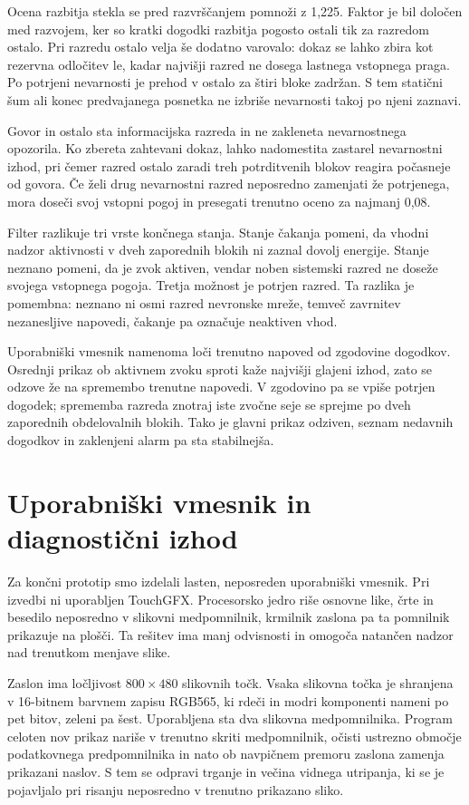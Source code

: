 Ocena razbitja stekla se pred razvrščanjem pomnoži z 1,225. Faktor je bil
določen med razvojem, ker so kratki dogodki razbitja pogosto ostali tik za
razredom ostalo. Pri razredu ostalo velja še dodatno varovalo: dokaz se lahko
zbira kot rezervna odločitev le, kadar najvišji razred ne dosega lastnega
vstopnega praga. Po potrjeni nevarnosti je prehod v ostalo za štiri bloke
zadržan. S tem statični šum ali konec predvajanega posnetka ne izbriše
nevarnosti takoj po njeni zaznavi.

Govor in ostalo sta informacijska razreda in ne zakleneta nevarnostnega
opozorila. Ko zbereta zahtevani dokaz, lahko nadomestita zastarel nevarnostni
izhod, pri čemer razred ostalo zaradi treh potrditvenih blokov reagira počasneje
od govora. Če želi drug nevarnostni razred neposredno zamenjati že potrjenega,
mora doseči svoj vstopni pogoj in presegati trenutno oceno za najmanj 0,08.

Filter razlikuje tri vrste končnega stanja. Stanje čakanja pomeni, da vhodni
nadzor aktivnosti v dveh zaporednih blokih ni zaznal dovolj energije. Stanje
neznano pomeni, da je zvok aktiven, vendar noben sistemski razred ne doseže
svojega vstopnega pogoja. Tretja možnost je potrjen razred. Ta razlika je
pomembna: neznano ni osmi razred nevronske mreže, temveč zavrnitev
nezanesljive napovedi, čakanje pa označuje neaktiven vhod.

Uporabniški vmesnik namenoma loči trenutno napoved od zgodovine dogodkov.
Osrednji prikaz ob aktivnem zvoku sproti kaže najvišji glajeni izhod, zato se
odzove že na spremembo trenutne napovedi. V zgodovino pa se vpiše potrjen
dogodek; sprememba razreda znotraj iste zvočne seje se sprejme po dveh
zaporednih obdelovalnih blokih. Tako je glavni prikaz odziven, seznam nedavnih
dogodkov in zaklenjeni alarm pa sta stabilnejša.

\section{Uporabniški vmesnik in diagnostični izhod}

Za končni prototip smo izdelali lasten, neposreden uporabniški vmesnik. Pri
izvedbi ni uporabljen TouchGFX. Procesorsko jedro riše osnovne like, črte in
besedilo neposredno v slikovni medpomnilnik, krmilnik zaslona pa ta pomnilnik
prikazuje na plošči. Ta rešitev ima manj odvisnosti in omogoča natančen nadzor
nad trenutkom menjave slike.

Zaslon ima ločljivost $800 \times 480$ slikovnih točk. Vsaka slikovna točka je
shranjena v 16-bitnem barvnem zapisu RGB565, ki rdeči in modri komponenti
nameni po pet bitov, zeleni pa šest. Uporabljena sta dva slikovna
medpomnilnika. Program celoten nov prikaz nariše v trenutno skriti
medpomnilnik, očisti ustrezno območje podatkovnega predpomnilnika in nato ob
navpičnem premoru zaslona zamenja prikazani naslov. S tem se odpravi trganje in
večina vidnega utripanja, ki se je pojavljalo pri risanju neposredno v trenutno
prikazano sliko.

